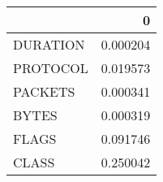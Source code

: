 \begin{tabular}{lr}
\toprule
{} &         0 \\
\midrule
DURATION &  0.000204 \\
PROTOCOL &  0.019573 \\
PACKETS  &  0.000341 \\
BYTES    &  0.000319 \\
FLAGS    &  0.091746 \\
CLASS    &  0.250042 \\
\bottomrule
\end{tabular}
